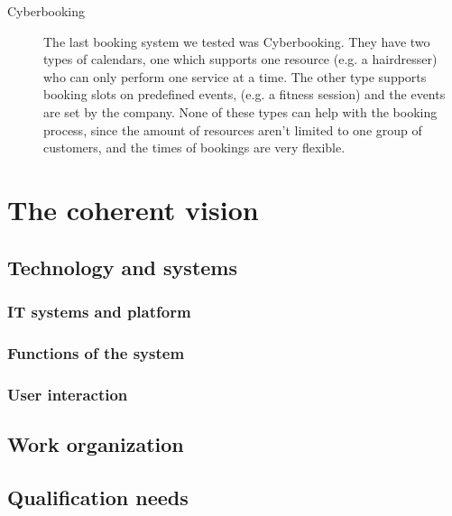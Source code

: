 \begin{description}
\item[Cyberbooking]
The last booking system we tested was Cyberbooking. They have two types of 
calendars, one which supports one resource (e.g. a hairdresser) who can only
perform one service at a time. The other type supports booking slots on 
predefined events, (e.g. a fitness session) and the events are set by the 
company. None of these types can help \gomonkey{} with the booking process,
since the amount of resources aren't limited to one group of customers, and 
the times of bookings are very flexible.

\end{description}


\section{The coherent vision}
\subsection{Technology and systems}
\subsubsection{IT systems and platform}

\subsubsection{Functions of the system}

\subsubsection{User interaction}

\subsection{Work organization}

\subsection{Qualification needs}
	
